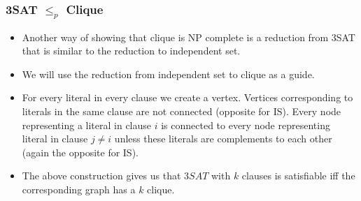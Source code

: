 \documentclass{beamer}
\begin{document}
\begin{frame}
  \frametitle{3SAT $\le_p$ Clique}
  \begin{itemize}
  \item Another way of showing that clique is NP complete is a reduction from 3SAT that is similar to the reduction to independent set.
  \item We will use the reduction from independent set to clique as a guide.
  \item For every literal in every clause we create a vertex. Vertices corresponding to literals in the same clause are not connected (opposite for IS). 
Every node representing a literal in clause $i$ is connected to every node representing literal in clause $j\ne i$ unless these literals are complements to each other (again the opposite for IS).
\item The above construction gives us that $3SAT$ with $k$ clauses is satisfiable iff the corresponding graph has a $k$ clique.
  \end{itemize}
\end{frame}
\end{document}
